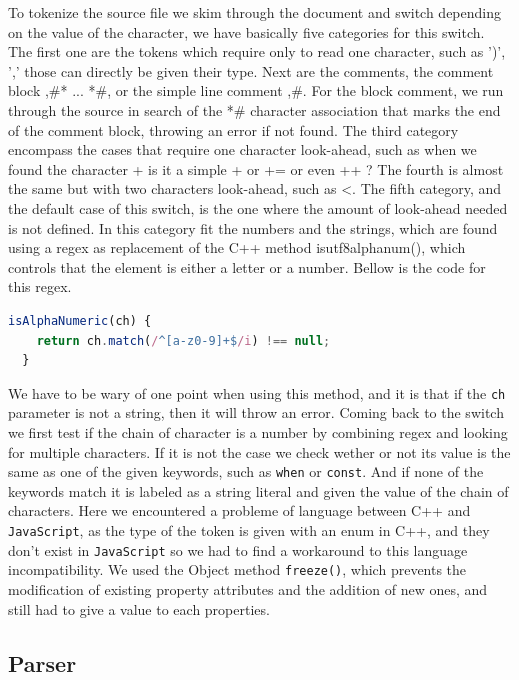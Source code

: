 \documentclass{scrbook}
\begin{document}
To tokenize the source file we skim through the document and switch depending on the value of the character, we have basically five categories for this switch.
The first one are the tokens which require only to read one character, such as ')', ',' those can directly be given their type. Next are the comments, the comment block ,\#* ... *\#, or the simple line comment ,\#. For the block comment,
we run through the source in search of the *\# character association that marks the end of the comment block, throwing an error if not found. The third category encompass the cases that require one character look-ahead, such as when we found
the character + is it a simple + or += or even ++ ? The fourth is almost the same but with two characters look-ahead, such as <. The fifth category, and the default case of this switch, is the one where the amount of look-ahead needed is not defined.
In this category fit the numbers and the strings, which are found using a regex as replacement of the C++ method is\textunderscore utf8\textunderscore alpha\textunderscore num(), which controls that the element is either a letter or a number. Bellow is 
the code for this regex.
\begin{lstlisting}[language=JavaScript, basicstyle=\ttfamily\small]
  isAlphaNumeric(ch) {
    return ch.match(/^[a-z0-9]+$/i) !== null;
  }
\end{lstlisting}  
We have to be wary of one point when using this method, and it is that if the \texttt{ch} parameter is not a string, then it will throw an error. Coming back to the switch we first test if the chain of character is a number by combining regex and looking for multiple characters.
If it is not the case we check wether or not its value is the same as one of the given keywords, such as \texttt{when} or \texttt{const}. And if none of the keywords match it is labeled as a string literal and given the value of the chain of characters. Here we encountered a probleme 
of language between C++ and \texttt{JavaScript}, as the type of the token is given with an enum in C++, and they don't exist in \texttt{JavaScript} so we had to find a workaround to this language incompatibility. We used the Object method \texttt{freeze()}, which prevents the modification of existing property attributes and the addition of new ones, 
and still had to give a value to each properties.

\subsection{Parser}
\end{document}
